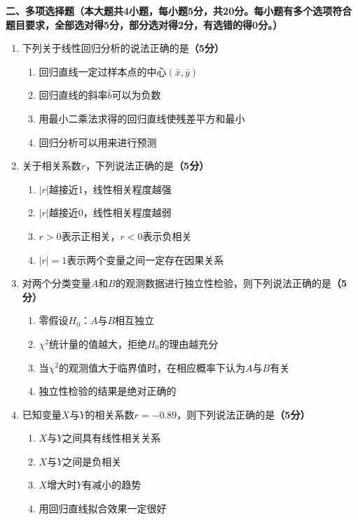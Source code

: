 \documentclass[12pt, a4paper]{ctexart}
\newcommand{\score}[1]{\hfill\textbf{（#1分）}}
\begin{document}
\vspace{0.5cm}

\noindent\textbf{二、多项选择题（本大题共4小题，每小题5分，共20分。每小题有多个选项符合题目要求，全部选对得5分，部分选对得2分，有选错的得0分。）}

\vspace{0.3cm}

\begin{enumerate}[label=\textbf{\arabic*.}, leftmargin=2em, resume]

\item 下列关于线性回归分析的说法正确的是\score{5}
\begin{enumerate}[label=\Alph*., leftmargin=2em]
\item 回归直线一定过样本点的中心$(\bar{x}, \bar{y})$
\item 回归直线的斜率$\hat{b}$可以为负数
\item 用最小二乘法求得的回归直线使残差平方和最小
\item 回归分析可以用来进行预测
\end{enumerate}

\item 关于相关系数$r$，下列说法正确的是\score{5}
\begin{enumerate}[label=\Alph*., leftmargin=2em]
\item $|r|$越接近1，线性相关程度越强
\item $|r|$越接近0，线性相关程度越弱
\item $r > 0$表示正相关，$r < 0$表示负相关
\item $|r| = 1$表示两个变量之间一定存在因果关系
\end{enumerate}

\item 对两个分类变量$A$和$B$的观测数据进行独立性检验，则下列说法正确的是\score{5}
\begin{enumerate}[label=\Alph*., leftmargin=2em]
\item 零假设$H_0$：$A$与$B$相互独立
\item $\chi^2$统计量的值越大，拒绝$H_0$的理由越充分
\item 当$\chi^2$的观测值大于临界值时，在相应概率下认为$A$与$B$有关
\item 独立性检验的结果是绝对正确的
\end{enumerate}

\item 已知变量$X$与$Y$的相关系数$r = -0.89$，则下列说法正确的是\score{5}
\begin{enumerate}[label=\Alph*., leftmargin=2em]
\item $X$与$Y$之间具有线性相关关系
\item $X$与$Y$之间是负相关
\item $X$增大时$Y$有减小的趋势
\item 用回归直线拟合效果一定很好
\end{enumerate}

\end{enumerate}
\end{document}
